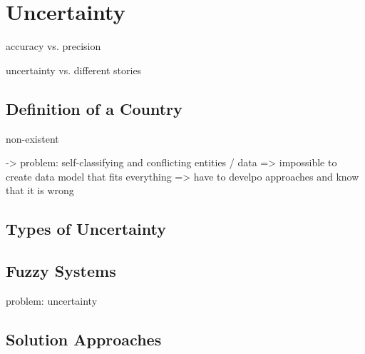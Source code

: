 
\section{Uncertainty} %
\label{sec:uncertainty}

accuracy vs. precision

uncertainty vs. different stories

\subsection{Definition of a Country} %
\label{sub:definition_of_a_country}

non-existent

-> problem: self-classifying and conflicting entities / data => impossible to create data model that fits everything
=> have to develpo approaches and know that it is wrong



\subsection{Types of Uncertainty} %
\label{sub:types_of_uncertainty}




\subsection{Fuzzy Systems} %
\label{sub:fuzzy_systems}

problem: uncertainty



\subsection{Solution Approaches} %
\label{sub:solution_approaches}




